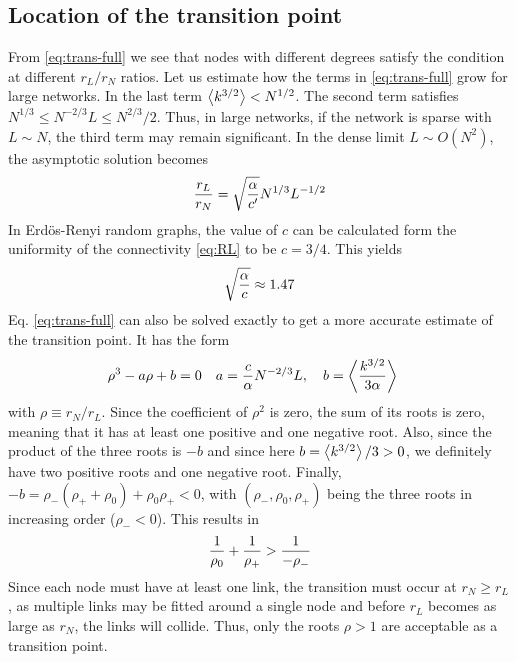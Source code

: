 \documentclass[endfloats,nofootinbib,preprint,floatfix,titlepage,superscriptaddress,linenumbers]{revtex4-1} %
\newcommand{\outNim}[1]{}
\begin{document}
{\subsection{Location of the transition point\label{ap:trans-loc}}
From \eqref{eq:trans-full} we see that nodes with different degrees satisfy the condition at different $r_L/r_N$ ratios. 
Let us estimate how the terms in \eqref{eq:trans-full} grow for large networks. 
In the last term $\left<k^{3/2}\right>< N^{1/2}$. 
The second term satisfies $N^{1/3} \leq N^{-2/3} L \leq N^{2/3}/2 $. 
Thus, in large networks, if the network is sparse with $L\sim N$, the third term may remain significant. 
In the dense limit $L\sim O(N^2)$,  
the asymptotic solution becomes
\begin{align}
    {r_L\over r_N} = \sqrt{{\alpha \over c'}}%
    N^{1/3}L^{-1/2} %
\end{align}
In Erd\"os-Renyi random graphs, the value of $c$ can be calculated form the uniformity of the connectivity \eqref{eq:RL} to be $c=3/4$. This yields 
\[ \sqrt{{\alpha \over c}} \approx 1.47\]
Eq. \eqref{eq:trans-full} can also be solved exactly to get a more accurate estimate of the transition point. 
It has the form 
\outNim{
\begin{align}
    &\rho^3 - a \rho + b =0 & a&= {c\over \alpha} N^{-2/3} L ,
    \quad b={ k^{3/2}\over 3\alpha } 
    \label{eq:rhoab}
\end{align}
}%
\begin{align}
    &\rho^3 - a \rho + b =0 & a&= {c\over \alpha} N^{-2/3} L ,
    \quad b=\left< k^{3/2}\over 3\alpha \right> 
    \label{eq:rhoab}
\end{align}
with $\rho \equiv r_N/r_L$.
Since the coefficient of $\rho^2$ is zero, the sum of its roots is zero, meaning that it has at least one positive and one negative root.
Also, since the product of the three roots is $-b$ and since here $b= \left<k^{3/2}\right>/3>0$, we definitely have two positive roots and one negative root. 
Finally, $-b = \rho_-(\rho_++\rho_0) +\rho_0\rho_+ <0$, with $(\rho_-,\rho_0,\rho_+)$ being the three roots in increasing order ($\rho_-<0$). 
This results in 
\[{1\over \rho_0} + {1\over \rho_+} > {1\over -\rho_-}\]
Since each node must have at least one link, the transition must occur at $r_N \geq r_L$, as multiple links may be fitted around a single node and before $r_L$ becomes as large as $r_N$, the links will collide. 
Thus, only the roots $\rho > 1$ are acceptable as a transition point. 

}
\end{document}
